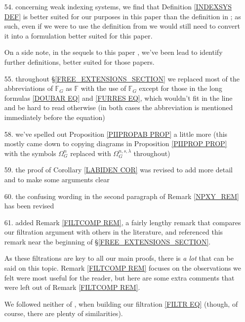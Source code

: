 \documentclass{article}
\begin{document}
\begin{itemize}
	\item[54.] concerning weak indexing systems,
	we find that Definition \ref{INDEXSYS DEF}
	is better suited for our purposes in this paper than 
	the definition in \cite{Pe17}; as such, even if we were to use the definition from \cite{Pe17} we would still need to convert it into a formulation better suited for this paper.
	
	On a side note, in the sequels to this paper 
	\cite{BP_edss}, \cite{BP_HGOP}
	we've been lead to identify further definitions,
	better suited for those papers.

	
	
	\item[55.] throughout \S \ref{FREE_EXTENSIONS_SECTION}
	we replaced most of the abbreviations of
	$\mathbb{F}_G$ as $\mathbb{F}$ with the use of $\mathbb{F}_G$
	except for those in the long formulas
	\eqref{DOUBAR EQ} and \eqref{FURRES EQ},
	which wouldn't fit in the line and be hard to read otherwise
	(in both cases the abbreviation is mentioned immediately before the equation)

	\item[58.]
	we've spelled out Proposition \ref{PIIPROPAB PROP}
	a little more (this mostly came down to copying
	diagrams in Proposition \ref{PIIPROP PROP}
	with the symbols 
	$\Omega^n_G$
	replaced with 
	$\Omega^{n,s,\lambda}_{G}$ throughout)
	
	\item[59.] the proof of Corollary \ref{LABIDEN COR}
	was revised to add more detail and to make
	some arguments clear

	\item[60.]
	the confusing wording in the second paragraph of 
	Remark \ref{NPXY_REM} has been revised

	\item[61.] added Remark \ref{FILTCOMP REM},
	a fairly lengthy remark that compares our filtration argument with others in the literature, and referenced this remark near the beginning of \S \ref{FREE_EXTENSIONS_SECTION}. 

	As these filtrations are key to all our main proofs,
	there is \emph{a lot} that can be said on this topic.
	Remark \ref{FILTCOMP REM} focuses on the observations we felt
	were most useful for the reader,
	but here are some extra comments that were left out of 
	Remark \ref{FILTCOMP REM}.
	
	We followed neither of \cite{BM03},\cite{BB17} 
	when building our filtration \eqref{FILTR EQ}
	(though, of course, there are plenty of similarities).
	

\end{itemize}
\end{document}
